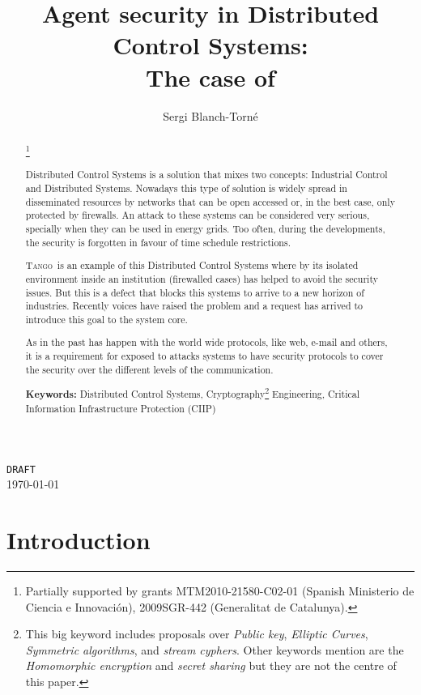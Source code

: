 \documentclass[10pt,a4paper,twoside]{llncs}
\title{Agent security in Distributed Control Systems: \\The case of \tango}
\author{Sergi Blanch-Torn\'e\inst{1}}%
\institute{
 Escola Polit\`ecnica Superior, Universitat de Lleida. Spain.\\
 \email{\tt sblanch@alumnes.udl.es}
 }
\newcommand{\tango}{\textsc{Tango}}
\begin{document}
\maketitle
\begin{center}
 {\tt DRAFT}\\
 \today\\
\end{center}

\begin{abstract}\footnote{Partially supported by grants MTM2010-21580-C02-01 (Spanish Ministerio de Ciencia e Innovaci\'on), 2009SGR-442 (Generalitat de Catalunya).}
 
    Distributed Control Systems is a solution that mixes two concepts: Industrial Control and Distributed Systems. Nowadays this type of solution is widely spread in disseminated resources by networks that can be open accessed or, in the best case, only protected by firewalls. An attack to these systems can be considered very serious, specially when they can be used in energy grids. Too often, during the developments, the security is forgotten in favour of time schedule restrictions.

    \tango\, is an example of this Distributed Control Systems where by its isolated environment inside an institution (firewalled cases) has helped to avoid the security issues. But this is a defect that blocks this systems to arrive to a new horizon of industries. Recently voices have raised the problem and a request has arrived to introduce this goal to the system core.

    As in the past has happen with the world wide protocols, like web, e-mail and others, it is a requirement for exposed to attacks systems to have security protocols to cover the security over the different levels of the communication.

{\bf Keywords:} Distributed Control Systems, Cryptography\footnote{This big keyword includes proposals over \emph{Public key}, \emph{Elliptic Curves}, \emph{Symmetric algorithms}, and \emph{stream cyphers}. Other keywords mention are the \emph{Homomorphic encryption} and \emph{secret sharing} but they are not the centre of this paper.} Engineering, Critical Information Infrastructure Protection (CIIP)

\end{abstract}

\section{Introduction}\label{sec:introduction}
\end{document}
